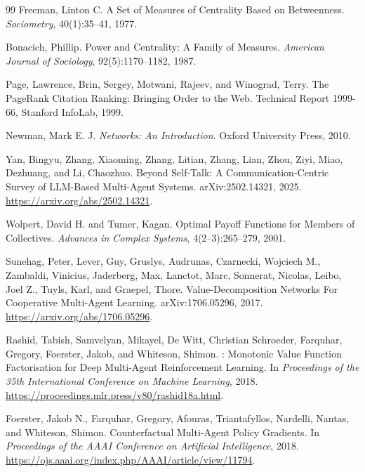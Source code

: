 \begin{thebibliography}{99}
Freeman, Linton C.
\newblock A Set of Measures of Centrality Based on Betweenness.
\newblock \emph{Sociometry}, 40(1):35--41, 1977.

Bonacich, Phillip.
\newblock Power and Centrality: A Family of Measures.
\newblock \emph{American Journal of Sociology}, 92(5):1170--1182, 1987.

Page, Lawrence, Brin, Sergey, Motwani, Rajeev, and Winograd, Terry.
\newblock The PageRank Citation Ranking: Bringing Order to the Web.
\newblock Technical Report 1999-66, Stanford InfoLab, 1999.

Newman, Mark E. J.
\newblock \emph{Networks: An Introduction}.
\newblock Oxford University Press, 2010.

Yan, Bingyu, Zhang, Xiaoming, Zhang, Litian, Zhang, Lian, Zhou, Ziyi, Miao, Dezhuang, and Li, Chaozhuo.
\newblock Beyond Self-Talk: A Communication-Centric Survey of LLM-Based Multi-Agent Systems.
\newblock arXiv:2502.14321, 2025.
\newblock \url{https://arxiv.org/abs/2502.14321}.

Wolpert, David H. and Tumer, Kagan.
\newblock Optimal Payoff Functions for Members of Collectives.
\newblock \emph{Advances in Complex Systems}, 4(2--3):265--279, 2001.

Sunehag, Peter, Lever, Guy, Gruslys, Audrunas, Czarnecki, Wojciech M., Zambaldi, Vinicius, Jaderberg, Max, Lanctot, Marc, Sonnerat, Nicolas, Leibo, Joel Z., Tuyls, Karl, and Graepel, Thore.
\newblock Value-Decomposition Networks For Cooperative Multi-Agent Learning.
\newblock arXiv:1706.05296, 2017.
\newblock \url{https://arxiv.org/abs/1706.05296}.

Rashid, Tabish, Samvelyan, Mikayel, De Witt, Christian Schroeder, Farquhar, Gregory, Foerster, Jakob, and Whiteson, Shimon.
: Monotonic Value Function Factorisation for Deep Multi-Agent Reinforcement Learning.
\newblock In \emph{Proceedings of the 35th International Conference on Machine Learning}, 2018.
\newblock \url{https://proceedings.mlr.press/v80/rashid18a.html}.

Foerster, Jakob N., Farquhar, Gregory, Afouras, Triantafyllos, Nardelli, Nantas, and Whiteson, Shimon.
\newblock Counterfactual Multi-Agent Policy Gradients.
\newblock In \emph{Proceedings of the AAAI Conference on Artificial Intelligence}, 2018.
\newblock \url{https://ojs.aaai.org/index.php/AAAI/article/view/11794}.

\end{thebibliography}

